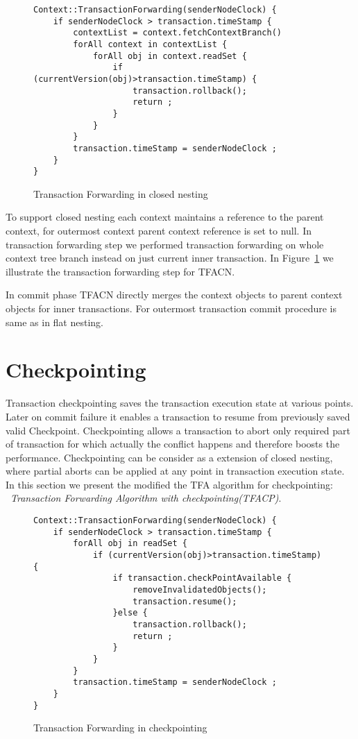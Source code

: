 \documentclass[12pt,english]{report}
\begin{document}
\begin{figure}[H]
\begin{minipage}[b]{0.9\linewidth}\centering
\begin{lstlisting}
Context::TransactionForwarding(senderNodeClock) {
	if senderNodeClock > transaction.timeStamp {
		contextList = context.fetchContextBranch()
		forAll context in contextList {
			forAll obj in context.readSet {
				if (currentVersion(obj)>transaction.timeStamp) { 
					transaction.rollback();
					return ;
				}		
			}
		}
		transaction.timeStamp = senderNodeClock ; 
	}
}
\end{lstlisting}
\end{minipage}
\caption{Transaction Forwarding in closed nesting}
\label{Fig:CloseTFA}
\end{figure} 

To support closed nesting each context maintains a reference to the parent context, for outermost context parent context reference is set to null. In transaction forwarding step we performed transaction forwarding on whole context tree branch instead on just current inner transaction. In Figure~\ref{Fig:CloseTFA} we illustrate the transaction forwarding step for TFACN.

In commit phase TFACN directly merges the context objects to parent context objects for inner transactions. For outermost transaction commit procedure is same as in flat nesting. 

\section{Checkpointing}

Transaction checkpointing saves the transaction execution state at various points. Later on commit failure it enables a transaction to resume from previously saved valid Checkpoint. Checkpointing allows a transaction to abort only required part of transaction for which actually the conflict happens and therefore boosts the performance. Checkpointing can be consider as a extension of closed nesting, where partial aborts can be applied at any point in transaction execution state. In this section we present  the modified the TFA algorithm for checkpointing: ~\emph{Transaction Forwarding Algorithm with checkpointing(TFACP)}.

\begin{figure}[H]
\begin{minipage}[b]{0.9\linewidth}\centering
\begin{lstlisting}
Context::TransactionForwarding(senderNodeClock) {
	if senderNodeClock > transaction.timeStamp {
		forAll obj in readSet {
			if (currentVersion(obj)>transaction.timeStamp) { 
				if transaction.checkPointAvailable {
					removeInvalidatedObjects();
					transaction.resume();
				}else {
					transaction.rollback();
					return ;
				}		
			}
		}
		transaction.timeStamp = senderNodeClock ; 
	}
}
\end{lstlisting}
\end{minipage}
\caption{Transaction Forwarding in checkpointing}
\label{Fig:CheckPointTFA}
\end{figure} 
\end{document}

